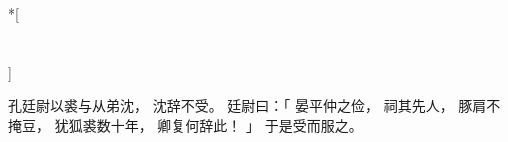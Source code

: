 
\switchcolumn[0]*[\section{}]

孔廷尉以裘与从弟沈，
沈辞不受。
廷尉曰：「
    晏平仲之俭，
    祠其先人，
    豚肩不掩豆，
    犹狐裘数十年，
    卿复何辞此！
」
于是受而服之。

\switchcolumn


